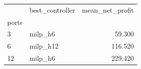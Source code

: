 \begin{tabular}{llr}
\toprule
 & best_controller & mean_net_profit \\
ports &  &  \\
\midrule
3 & milp_h6 & 59.300 \\
6 & milp_h12 & 116.520 \\
12 & milp_h6 & 229.420 \\
\bottomrule
\end{tabular}
